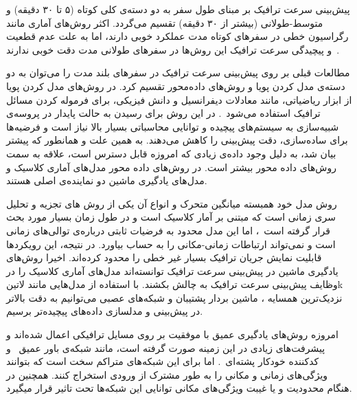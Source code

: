 
پیش‌بینی سرعت ترافیک بر مبنای طول سفر به دو دسته‌ی کلی کوتاه (۵ تا ۳۰ دقیقه) و متوسط-طولانی (بیشتر از ۳۰ دقیقه) تقسیم می‌گردد.
اکثر روش‌های آماری مانند رگراسیون خطی در سفرهای کوتاه مدت عملکرد خوبی دارند، اما به علت عدم قطعیت و پیچیدگی سرعت ترافیک این روش‌ها در سفرهای طولانی مدت دقت خوبی ندارند~.

مطالعات قبلی بر روی پیش‌بینی سرعت ترافیک در سفرهای بلند مدت را می‌توان به دو دسته‌ی مدل کردن پویا و روش‌های داده‌محور تقسیم کرد.
در روش‌های مدل کردن پویا از ابزار ریاضیاتی، مانند معادلات دیفرانسیل و دانش فیزیکی، برای فرموله کردن مسائل ترافیک استفاده می‌شود~.
در این روش برای رسیدن به حالت پایدار در پروسه‌ی شبیه‌سازی به سیستم‌های پیچیده و توانایی محاسباتی بسیار بالا نیاز است و فرضیه‌ها برای ساده‌سازی، دقت پیش‌بینی را کاهش می‌دهند.
به همین علت و همانطور که پیشتر بیان شد، به دلیل وجود داده‌ی زیادی که امروزه قابل دسترس است، علاقه به سمت روش‌های داده محور بیشتر است.
در روش‌های داده محور مدل‌های آماری کلاسیک و مدل‌های یادگیری ماشین دو نماینده‌ی اصلی هستند.

روش مدل خود همبسته میانگین متحرک و انواع آن یکی از روش های تجزیه و تحلیل سری زمانی است که مبتنی بر آمار کلاسیک است
و در طول زمان بسیار مورد بحث قرار گرفته است~،
اما این مدل محدود به فرضیات ثابتی درباره‌ی توالی‌های زمانی است و نمی‌تواند ارتباطات زمانی-مکانی را به حساب بیاورد. در نتیجه، این رویکردها قابلیت نمایش جریان ترافیک بسیار غیر خطی را محدود کرده‌اند.
اخیرا روش‌های یادگیری ماشین در پیش‌بینی سرعت ترافیک توانسته‌اند مدل‌های آماری کلاسیک را در وظایف پیش‌بینی سرعت ترافیک به چالش بکشند. با استفاده از مدل‌هایی مانند ‌لاتین{k} نزدیک‌ترین همسایه ، ماشین بردار پشتیبان  و شبکه‌های عصبی  می‌توانیم به دقت بالاتر در پیش‌بینی و مدلسازی داده‌های پیچیده‌تر برسیم.

امروزه روش‌های یادگیری عمیق با موفقیت بر روی مسايل ترافیکی اعمال شده‌اند و پیشرفت‌های زیادی در این زمینه صورت گرفته است، مانند شبکه‌ی باور عمیق~ و کدکننده خودکار پشته‌ای~.
اما برای این شبکه‌های متراکم سخت است که بتوانند ویژگی‌های زمانی و مکانی را به طور مشترک از ورودی استخراج کنند.
همچنین در هنگام محدودیت و یا غیبت ویژگی‌های مکانی توانایی این شبکه‌ها تحت تاثیر قرار میگیرد.


